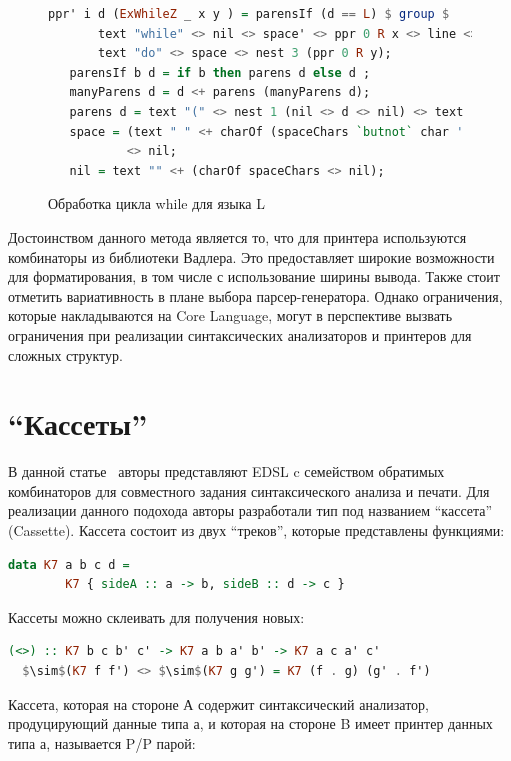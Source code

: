 \begin{figure}[ht]
\centering
\begin{lstlisting}[language=Haskell]
   ppr' i d (ExWhileZ _ x y ) = parensIf (d == L) $ group $ 
       text "while" <> nil <> space' <> ppr 0 R x <> line <> 
       text "do" <> space <> nest 3 (ppr 0 R y);                                                
   parensIf b d = if b then parens d else d ;
   manyParens d = d <+ parens (manyParens d);
   parens d = text "(" <> nest 1 (nil <> d <> nil) <> text ")";
   space = (text " " <+ charOf (spaceChars `butnot` char ' ')) 
           <> nil;
   nil = text "" <+ (charOf spaceChars <> nil);
\end{lstlisting}
\caption{Обработка цикла while для языка L}
\label{LFliPpr}
\end{figure}

Достоинством данного метода является то, что для принтера используются комбинаторы из библиотеки Вадлера. 
Это предоставляет широкие возможности для форматирования, в том числе с использование ширины вывода. 
Также стоит отметить вариативность в плане выбора парсер-генератора. Однако ограничения, которые
накладываются на Core Language, могут в перспективе вызвать ограничения при реализации 
синтаксических анализаторов и принтеров для сложных структур.

\section{``Кассеты''}

В данной статье~\cite{Boespflug} авторы представляют EDSL c семейством обратимых комбинаторов для совместного 
задания синтаксического анализа и печати. Для реализации данного подохода авторы разработали 
тип под названием ``кассета'' (Cassette). Кассета состоит из двух ``треков'', которые представлены функциями:

\begin{lstlisting}[mathescape,language=Haskell]
   data K7 a b c d = 
        K7 { sideA :: a -> b, sideB :: d -> c }
\end{lstlisting}

Кассеты можно склеивать для получения новых:

\begin{lstlisting}[mathescape,language=Haskell]
  (<>) :: K7 b c b' c' -> K7 a b a' b' -> K7 a c a' c'
  $\sim$(K7 f f') <> $\sim$(K7 g g') = K7 (f . g) (g' . f')
\end{lstlisting}

Кассета, которая на стороне А содержит синтаксический анализатор, продуцирующий данные типа $а$, и которая
на стороне B имеет принтер данных типа $а$, называется P/P парой:

